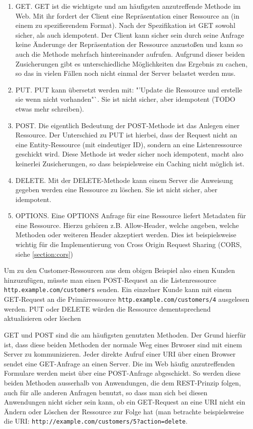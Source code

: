 \begin{enumerate}
 \item GET. GET ist die wichtigste und am häufigsten anzutreffende Methode im Web. Mit ihr fordert der Client eine Repräsentation einer Ressource an (in einem zu spezifierendem Format). Nach der Spezifikation ist GET sowohl sicher, als auch idempotent. Der Client kann sicher sein durch seine Anfrage keine Änderunge der Repräsentation der Ressource anzustoßen und kann so auch die Methode mehrfach hintereinander aufrufen. Aufgrund dieser beiden Zusicherungen gibt es unterschiedliche Möglichkeiten das Ergebnis zu cachen, so das in vielen Fällen noch nicht einmal der Server belastet werden mus.
 \item PUT. PUT kann übersetzt werden mit: "'Update die Ressource und erstelle sie wenn nicht vorhanden"`. Sie ist nicht sicher, aber idempotent (TODO etwas mehr schreiben). 
 \item POST. Die eigentlich Bedeutung der POST-Methode ist das Anlegen einer Ressource. Der Unterschied zu PUT ist hierbei, dass der Request nicht an eine Entity-Ressource (mit eindeutiger ID), sondern an eine Listenressource geschickt wird. Diese Methode ist weder sicher noch idempotent, macht also keinerlei Zusicherungen, so dass beispielsweise ein Caching nicht möglich ist.
 \item DELETE. Mit der DELETE-Methode kann einem Server die Anweisung gegeben werden eine Ressource zu löschen. Sie ist nicht sicher, aber idempotent.
 \item OPTIONS. Eine OPTIONS Anfrage für eine Ressource liefert Metadaten für eine Ressource. Hierzu gehören z.B. Allow-Header, welche angeben, welche Methoden oder weiteren Header akzeptiert werden. Dies ist beispielsweise wichtig für die Implementierung von Cross Origin Request Sharing (CORS, siehe \ref{section:cors})
\end{enumerate}

Um zu den Customer-Ressourcen aus dem obigen Beispiel also einen Kunden hinzuzufügen, müsste man einen POST-Request an die Listenressource \texttt{http.example.com/customers} senden. Ein einzelner Kunde kann mit einem GET-Request an die Primärressource \texttt{http.example.com/customers/4} ausgelesen werden. PUT oder DELETE würden die Ressource dementsprechend aktualisieren oder löschen

GET und POST sind die am häufigsten genutzten Methoden. Der Grund hierfür ist, dass diese beiden Methoden der normale Weg eines Brwoser sind mit einem Server zu kommunizieren. Jeder direkte Aufruf einer URI über einen Browser sendet eine GET-Anfrage an einen Server. Die im Web häufig anzutreffenden Formulare werden meist über eine POST-Anfrage abgeschickt. So werden diese beiden Methoden ausserhalb von Anwendungen, die dem REST-Prinzip folgen, auch für alle anderen Anfragen benutzt, so dass man sich bei diesen Anwendungen nicht sicher sein kann, ob ein GET-Request an eine URI nicht ein Ändern oder Löschen der Ressource zur Folge hat (man betrachte beispielsweise die URI: \texttt{http://example.com/customers/5?action=delete}.

